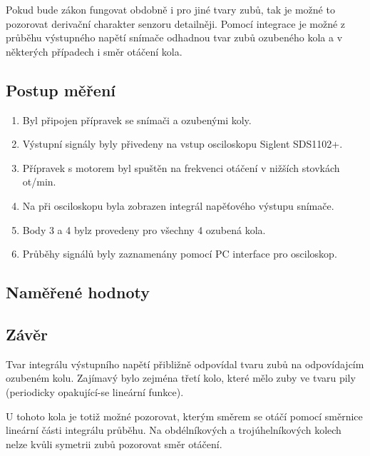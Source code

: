 \documentclass{protokol}
\begin{document}
        Pokud bude zákon fungovat obdobně i pro jiné tvary zubů, tak je možné to pozorovat derivační charakter senzoru detailněji. Pomocí integrace je možné z průběhu výstupného napětí snímače odhadnou tvar zubů ozubeného kola a v některých případech i směr otáčení kola.
    \subsection{Postup měření}
        \begin{enumerate}
            \item Byl připojen přípravek se snímači a ozubenými koly.
            \item Výstupní signály byly přivedeny na vstup osciloskopu Siglent SDS1102+.
            \item Přípravek s motorem byl spuštěn na frekvenci otáčení v nižších stovkách ot/min.
            \item Na při osciloskopu byla zobrazen integrál napěťového výstupu snímače.
            \item Body 3 a 4 bylz provedeny pro všechny 4 ozubená kola.
            \item Průběhy signálů byly zaznamenány pomocí PC interface pro osciloskop.
        \end{enumerate}

    
    \subsection{Naměřené hodnoty}
        \pagebreak
    \pagebreak
    \subsection{Závěr}
        Tvar integrálu výstupního napětí přibližně odpovídal tvaru zubů na odpovídajcím ozubeném kolu. Zajímavý bylo zejména třetí kolo, které mělo zuby ve tvaru pily (periodicky opakující-se lineární funkce).
        
        U tohoto kola je totiž možné pozorovat, kterým směrem se otáčí pomocí směrnice lineární části integrálu průběhu. Na obdélníkových a trojúhelníkových kolech nelze kvůli symetrii zubů pozorovat směr otáčení.
\end{document}
